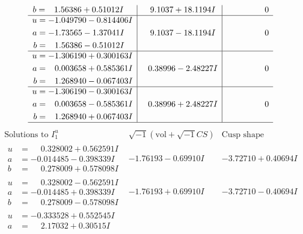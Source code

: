 \documentclass[1p]{elsarticle_modified}
\theoremstyle{definition}
\newcommand{\I}{\sqrt{-1}}
\begin{document}
$$\begin{array}{c|c|c}
\begin{aligned}
b &= \phantom{-}1.56386 + 0.51012 I\end{aligned}
 & \phantom{-}9.1037 + 18.1194 I & \phantom{-0.000000 } 0 \\ \hline\begin{aligned}
u &= -1.049790 - 0.814406 I \\
a &= -1.73565 - 1.37041 I \\
b &= \phantom{-}1.56386 - 0.51012 I\end{aligned}
 & \phantom{-}9.1037 - 18.1194 I & \phantom{-0.000000 } 0 \\ \hline\begin{aligned}
u &= -1.306190 + 0.300163 I \\
a &= \phantom{-}0.003658 + 0.585361 I \\
b &= \phantom{-}1.268940 - 0.067403 I\end{aligned}
 & \phantom{-}0.38996 - 2.48227 I & \phantom{-0.000000 } 0 \\ \hline\begin{aligned}
u &= -1.306190 - 0.300163 I \\
a &= \phantom{-}0.003658 - 0.585361 I \\
b &= \phantom{-}1.268940 + 0.067403 I\end{aligned}
 & \phantom{-}0.38996 + 2.48227 I & \phantom{-0.000000 } 0\\
 \hline 
 \end{array}$$\newpage$$\begin{array}{c|c|c}  
\text{Solutions to }I^u_{1}& \I (\text{vol} + \sqrt{-1}CS) & \text{Cusp shape}\\
 \hline 
\begin{aligned}
u &= \phantom{-}0.328002 + 0.562591 I \\
a &= -0.014485 - 0.398339 I \\
b &= \phantom{-}0.278009 + 0.578098 I\end{aligned}
 & -1.76193 - 0.69910 I & -3.72710 + 0.40694 I \\ \hline\begin{aligned}
u &= \phantom{-}0.328002 - 0.562591 I \\
a &= -0.014485 + 0.398339 I \\
b &= \phantom{-}0.278009 - 0.578098 I\end{aligned}
 & -1.76193 + 0.69910 I & -3.72710 - 0.40694 I \\ \hline\begin{aligned}
u &= -0.333528 + 0.552545 I \\
a &= \phantom{-}2.17032 + 0.30515 I \\

\end{aligned}
\end{array}$$
\end{document}

